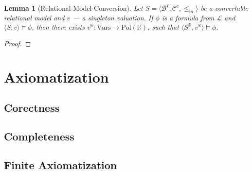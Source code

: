 \documentclass{article}
\newtheorem*{lemma}{Lemma}
\newcommand{\R}{\mathbb{R}}
\newcommand{\B}{\mathcal{B}}
\newcommand{\lang}{\mathcal{L}}
\newcommand{\Vars}{\text{Vars}}
\newcommand{\Pol}{\text{Pol}}
\begin{document}
\begin{lemma}[Relational Model Conversion]
  Let $S = \langle \B^I, \mathcal{C}^c, \leq_m \rangle$ be a convertable relational model and $v$ --- a singleton valuation. If $\phi$ is a formula from $\lang$ and $\langle S, v \rangle \models \phi$, then there exists $v^\R: \Vars \rightarrow \Pol(\R)$, such that $\langle S^\R, v^\R \rangle \models \phi$.
\end{lemma}
\begin{proof}
\end{proof}
\section{Axiomatization}
\subsection{Corectness}
\subsection{Completeness}
\subsection{Finite Axiomatization}
\end{document}
